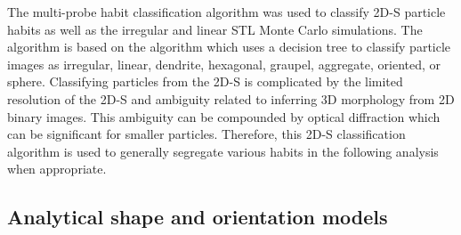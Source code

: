 \documentclass[amt, manuscript]{copernicus}
\begin{document}


The \citet{Schima2024} multi-probe habit classification algorithm was used to classify 2D-S particle habits as well as the irregular and linear STL Monte Carlo simulations. The algorithm is based on the \citet{Holroyd1987} algorithm which uses a decision tree to classify particle images as irregular, linear, dendrite, hexagonal, graupel, aggregate, oriented, or sphere. Classifying particles from the 2D-S is complicated by the limited resolution of the 2D-S and ambiguity related to inferring 3D morphology from 2D binary images. This ambiguity can be compounded by optical diffraction which can be significant for smaller particles. Therefore, this 2D-S classification algorithm is used to generally segregate various habits in the following analysis when appropriate.


\subsection{Analytical shape and orientation models}\label{methods:math}
\end{document}
